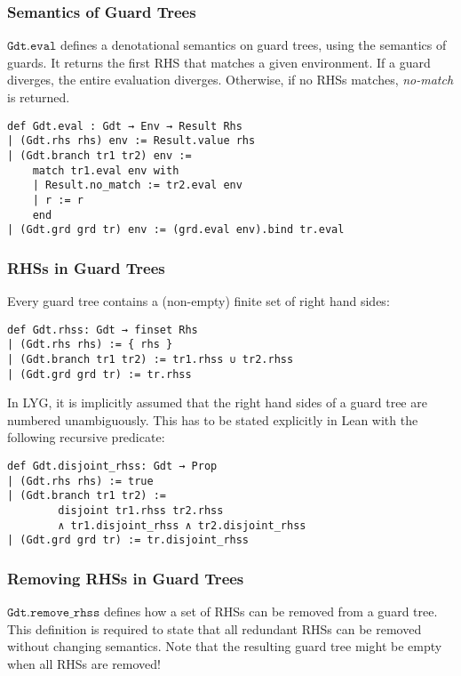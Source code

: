 \subsubsection{Semantics of Guard Trees}

$\mathtt{Gdt.eval}$ defines a denotational semantics on guard trees, using the semantics of guards.
It returns the first RHS that matches a given environment. If a guard diverges, the entire evaluation diverges. Otherwise, if no RHSs matches, \textit{no-match} is returned.

\begin{verbatim}
def Gdt.eval : Gdt → Env → Result Rhs
| (Gdt.rhs rhs) env := Result.value rhs
| (Gdt.branch tr1 tr2) env :=
    match tr1.eval env with
    | Result.no_match := tr2.eval env
    | r := r
    end
| (Gdt.grd grd tr) env := (grd.eval env).bind tr.eval
\end{verbatim}

\subsubsection{RHSs in Guard Trees}

Every guard tree contains a (non-empty) finite set of right hand sides:
\begin{verbatim}
def Gdt.rhss: Gdt → finset Rhs
| (Gdt.rhs rhs) := { rhs }
| (Gdt.branch tr1 tr2) := tr1.rhss ∪ tr2.rhss
| (Gdt.grd grd tr) := tr.rhss
\end{verbatim}

In LYG, it is implicitly assumed that the right hand sides of a guard tree are numbered unambiguously.
This has to be stated explicitly in Lean with the following recursive predicate:

\begin{verbatim}
def Gdt.disjoint_rhss: Gdt → Prop
| (Gdt.rhs rhs) := true
| (Gdt.branch tr1 tr2) :=
        disjoint tr1.rhss tr2.rhss
        ∧ tr1.disjoint_rhss ∧ tr2.disjoint_rhss
| (Gdt.grd grd tr) := tr.disjoint_rhss
\end{verbatim}

\subsubsection{Removing RHSs in Guard Trees}

$\mathtt{Gdt.remove\_rhss}$ defines how a set of RHSs can be removed from a guard tree.
This definition is required to state that all redundant RHSs can be removed without changing semantics.
Note that the resulting guard tree might be empty when all RHSs are removed!

